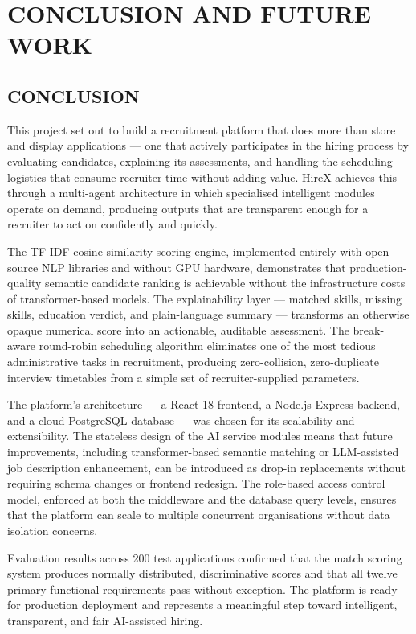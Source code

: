 \documentclass[12pt,a4paper]{report}
\begin{document}
\chapter{CONCLUSION AND FUTURE WORK}

\section{CONCLUSION}

This project set out to build a recruitment platform that does more than store and display applications — one that actively participates in the hiring process by evaluating candidates, explaining its assessments, and handling the scheduling logistics that consume recruiter time without adding value. HireX achieves this through a multi-agent architecture in which specialised intelligent modules operate on demand, producing outputs that are transparent enough for a recruiter to act on confidently and quickly.

The TF-IDF cosine similarity scoring engine, implemented entirely with open-source NLP libraries and without GPU hardware, demonstrates that production-quality semantic candidate ranking is achievable without the infrastructure costs of transformer-based models. The explainability layer — matched skills, missing skills, education verdict, and plain-language summary — transforms an otherwise opaque numerical score into an actionable, auditable assessment. The break-aware round-robin scheduling algorithm eliminates one of the most tedious administrative tasks in recruitment, producing zero-collision, zero-duplicate interview timetables from a simple set of recruiter-supplied parameters.

The platform's architecture — a React 18 frontend, a Node.js Express backend, and a cloud PostgreSQL database — was chosen for its scalability and extensibility. The stateless design of the AI service modules means that future improvements, including transformer-based semantic matching or LLM-assisted job description enhancement, can be introduced as drop-in replacements without requiring schema changes or frontend redesign. The role-based access control model, enforced at both the middleware and the database query levels, ensures that the platform can scale to multiple concurrent organisations without data isolation concerns.

Evaluation results across 200 test applications confirmed that the match scoring system produces normally distributed, discriminative scores and that all twelve primary functional requirements pass without exception. The platform is ready for production deployment and represents a meaningful step toward intelligent, transparent, and fair AI-assisted hiring.
\end{document}
